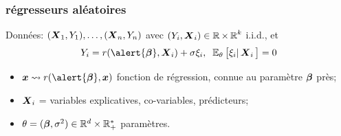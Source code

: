 %
%
%
\begin{frame}
\frametitle{régresseurs aléatoires}
\begin{df}
Données: $(\operatorname{\boldsymbol{X}}_1,Y_1),\ldots, (\operatorname{\boldsymbol{X}}_n,Y_n)$ avec $(Y_i,\operatorname{\boldsymbol{X}}_i)\in \operatorname{{\mathbb R}}\times \operatorname{{\mathbb R}}^k$ \alert{i.i.d.},
et
$$Y_i = r(\alert{\truebeta},\bX_i)+ \sigma \xi_i,\;\;
\E_{\truetheta}\big[\xi_i|\bX_i\big]=0
$$
\begin{itemize}
\item \alert<1>{$\bx \leadsto r(\alert{\truebeta},\bx)$ fonction de \alert{ régression}, connue au paramètre
$\boldsymbol{\beta}$ près;}
\item \alert<2>{$\operatorname{\boldsymbol{X}}_i$ = variables explicatives, co-variables, prédicteurs;}
\item \alert<3>{$\theta= (\boldsymbol{\beta},\sigma^2) \in \mathbb{R}^d \times \mathbb{R}_+^*$ paramètres.}
\end{itemize}
\end{df}
\end{frame}



